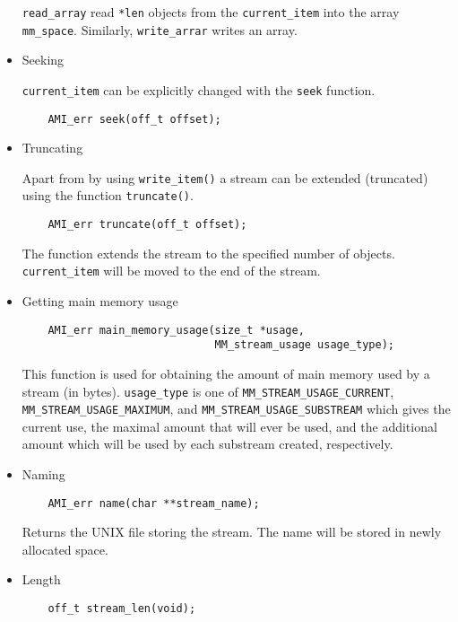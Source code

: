 \begin{itemize}
\verb|read_array| read \verb|*len| objects from the \verb|current_item| into
the array \verb|mm_space|. Similarly, \verb|write_arrar| writes an
array.

\item{Seeking}

\verb|current_item| can be explicitly changed with the \verb|seek| function.
\begin{verbatim}
    AMI_err seek(off_t offset);
\end{verbatim}

\item{Truncating}

Apart from by using \verb|write_item()| a stream can be extended
(truncated) using the function \verb|truncate()|.

\begin{verbatim}
    AMI_err truncate(off_t offset);
\end{verbatim}
The function extends the stream to the specified number of
objects. \verb|current_item| will be moved to the end of the stream.

\item{Getting main memory usage}

\begin{verbatim}
    AMI_err main_memory_usage(size_t *usage,
                              MM_stream_usage usage_type);
\end{verbatim}

This function is used for obtaining the amount of main memory used by a
stream (in bytes). \verb|usage_type| is one of
\verb|MM_STREAM_USAGE_CURRENT|, \verb|MM_STREAM_USAGE_MAXIMUM|, and
\verb|MM_STREAM_USAGE_SUBSTREAM| which gives the current use, the maximal
amount that will ever be used, and the additional amount which will be used
by each substream created, respectively.

\item{Naming}

\begin{verbatim}
    AMI_err name(char **stream_name);
\end{verbatim}

Returns the UNIX file storing the stream.  The name will be stored in newly
allocated space.

\item{Length}

\begin{verbatim}
    off_t stream_len(void);
\end{verbatim}


\end{itemize}
